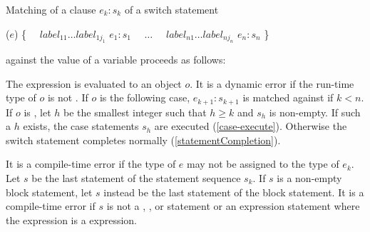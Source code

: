 \documentclass[makeidx]{article}
\begin{document}
{\LMHash{}%
Matching of a \CASE{} clause \CASE{} $e_{k}: s_{k}$ of a switch statement

\begin{normativeDartCode}
\SWITCH{} ($e$) \{
\ \ $label_{11} \ldots label_{1j_1}$ \CASE{} $e_1: s_1$
\ \ $\ldots$
\ \ $label_{n1} \ldots label_{nj_n}$ \CASE{} $e_n: s_n$
\}
\end{normativeDartCode}

against the value of a variable \id{} proceeds as follows:

\LMHash{}%
The expression  is evaluated to an object $o$.
It is a dynamic error if the run-time type of $o$ is not .
If $o$ is \FALSE{} the following case, \CASE{} $e_{k+1}: s_{k+1}$ is matched against \id{} if $k < n$.
If $o$ is \TRUE{}, let $h$ be the smallest integer such that $h \ge k$ and $s_h$ is non-empty.
If such a $h$ exists, the case statements $s_h$ are executed (\ref{case-execute}).
Otherwise the switch statement completes normally (\ref{statementCompletion}).

\LMHash{}%
It is a compile-time error if the type of $e$ may not be assigned to the type of $e_k$.
Let $s$ be the last statement of the statement sequence $s_k$.
If $s$ is a non-empty block statement, let $s$ instead be the last statement of the block statement.
It is a compile-time error if $s$ is not a \BREAK{}, \CONTINUE{}, \RETHROW{} or \RETURN{} statement
or an expression statement where the expression is a \THROW{} expression.

}
\end{document}
